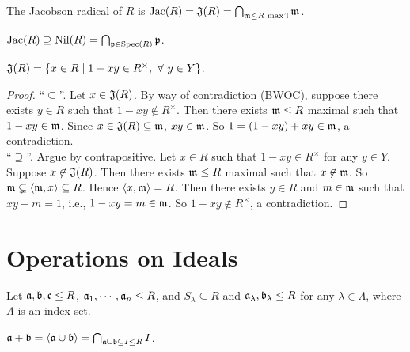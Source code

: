 \begin{definition}
    The Jacobson radical of $R$ is $\operatorname{Jac}(R) = \mathfrak{J}(R) = \bigcap_{\mathfrak{m} \leq R \text{ max'l}}\mathfrak{m}$.
\end{definition}

\begin{fact}
    $\operatorname{Jac}(R) \supseteq \operatorname{Nil}(R) = \bigcap_{\mathfrak{p} \in \operatorname{Spec}(R)}\mathfrak{p}$.
\end{fact}

\begin{proposition}
    $\mathfrak{J}(R) = \{x \in R \mid 1-xy \in R^\times, \ \forall \  y \in Y\}$.
\end{proposition}

\begin{proof}
    ``$\subseteq$''. Let $x \in \mathfrak{J}(R)$. By way of contradiction (BWOC), suppose there exists $y \in R$ such that $1-xy \not \in R^\times$. Then there exists $\mathfrak{m} \leq R$ maximal such that $1-xy \in \mathfrak{m}$. Since $x \in \mathfrak{J}(R) \subseteq \mathfrak{m}$, $xy \in \mathfrak{m}$. So $1 = (1-xy) + xy \in \mathfrak{m}$, a contradiction. \\
    ``$\supseteq$''. Argue by contrapositive. Let $x \in R$ such that $1-xy \in R^\times$ for any $y \in Y$. Suppose $x \not \in \mathfrak{J}(R)$. Then there exists $\mathfrak{m} \leq R$ maximal such that $x \not \in \mathfrak{m}$. So $\mathfrak{m} \subsetneq \langle \mathfrak{m}, x \rangle \subseteq R$. Hence $\langle x,\mathfrak{m} \rangle = R$. Then there exists $y \in R$ and $m \in \mathfrak{m}$ such that $xy+m = 1$, i.e., $1-xy = m \in \mathfrak{m}$. So $1-xy \not \in R^\times$, a contradiction.
\end{proof}

\section{Operations on Ideals}

Let $\mathfrak{a},\mathfrak{b},\mathfrak{c} \leq R$, $\mathfrak{a}_1,\cdots,\mathfrak{a}_n \leq R$, and $S_\lambda \subseteq R$ and $\mathfrak{a}_\lambda,\mathfrak{b}_\lambda \leq R$ for any $\lambda \in \Lambda$, where $\Lambda$ is an index set.

\begin{definition}
    $\mathfrak{a} + \mathfrak{b} = \langle \mathfrak{a} \cup \mathfrak{b} \rangle = \bigcap_{\mathfrak{a} \cup \mathfrak{b} \subseteq I \leq R}I$.
\end{definition}

